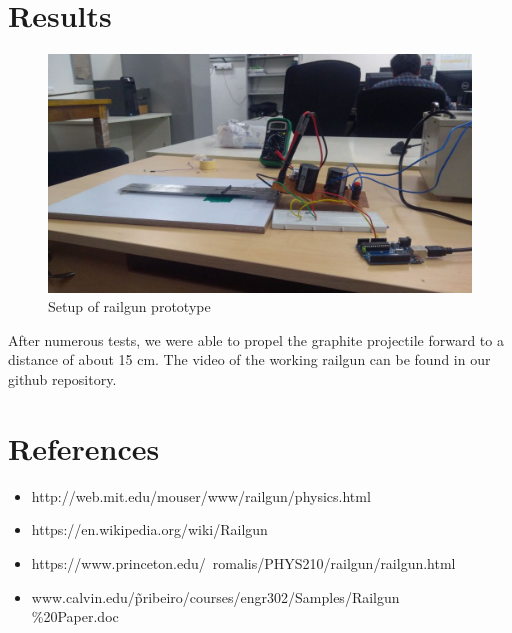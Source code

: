 \documentclass[twocolumn]{article}
\begin{document}
\section{Results}
\begin{figure}[htp]
	\caption{Setup of railgun prototype}
	\includegraphics[width=\linewidth]{crcktimage.jpeg}
\end{figure}

After numerous tests, we were able to propel the graphite projectile forward to a distance of about 15 cm. The video of the working railgun can be found in our github repository.


\section{References} 
\begin{itemize}
\item http://web.mit.edu/mouser/www/railgun/physics.html

\item https://en.wikipedia.org/wiki/Railgun

\item https://www.princeton.edu/~romalis/PHYS210/railgun/railgun.html

\item www.calvin.edu/\~pribeiro/courses/engr302/Samples/Railgun\\\%20Paper.doc

\end{itemize}
\end{document}
